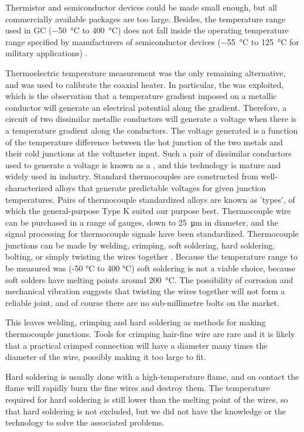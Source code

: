 Thermistor and semiconductor devices could be made small enough, but all
commercially available packages are too large. Besides, the temperature range
used in GC (\SI{-50}{\celsius} to \SI{400}{\celsius}) does not fall inside the
operating temperature range specified by manufacturers of semiconductor devices
(\SI{-55}{\celsius} to \SI{125}{\celsius} for military applications)
\autocite{nullD1996}.

Thermoelectric temperature measurement was the only remaining alternative, and
was used to calibrate the coaxial heater. In particular, the  was exploited, which is the observation that a temperature gradient
imposed on a metallic conductor will generate an electrical potential along the
gradient. Therefore, a circuit of two dissimilar metallic conductors will
generate a voltage when there is a temperature gradient along the conductors.
The voltage generated is a function of the temperature difference between the
hot junction of the two metals and their cold junctions at the voltmeter input.
Such a pair of dissimilar conductors used to generate a voltage is known as a
, and this technology is mature and widely used in
industry. Standard thermocouples are constructed from well-characterized alloys
that generate predictable voltages for given junction temperatures. Pairs of
thermocouple standardized alloys are known as 'types', of which the
general-purpose Type K suited our purpose best. Thermocouple wire can be
purchased in a range of gauges, down to \SI{25}{\micro\metre} in diameter, and
the signal processing for thermocouple signals have been standardized.
Thermocouple junctions can be made by welding, crimping, soft soldering, hard
soldering, bolting, or simply twisting the wires together \autocite{McGee1988}.
Because the temperature range to be measured was ({-}50 \si{\celsius} to 400
\si{\celsius}) soft soldering is not a viable choice, because soft solders have
melting points around \SI{200}{\celsius}. The possibility of corrosion and
mechanical vibration suggests that twisting the wires together will not form a
reliable joint, and of course there are no sub-millimetre bolts on the market.

This leaves welding, crimping and hard soldering as methods for making
thermocouple junctions. Tools for crimping hair-fine wire are rare and it is
likely that a practical crimped connection will have a diameter many times the
diameter of the wire, possibly making it too large to fit.

Hard soldering is usually done with a high-temperature flame, and on contact the
flame will rapidly burn the fine wires and destroy them. The temperature
required for hard soldering is still lower than the melting point of the wires,
so that hard soldering is not excluded, but we did not have the knowledge or the
technology to solve the associated problems.

